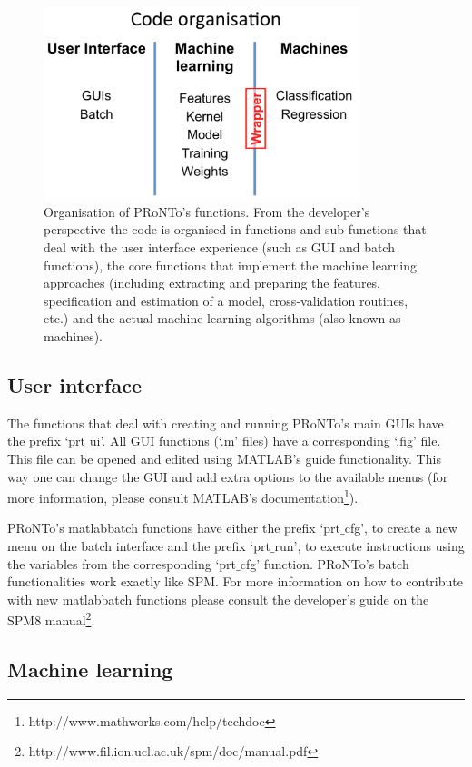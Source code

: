 \begin{figure}[!htbp]
  \begin{center}
      \includegraphics[height=2.2in]{images/code_pronto.png}
   \caption{Organisation of PRoNTo's functions. From the developer's perspective the code is organised in functions and sub functions that deal with the user interface experience (such as GUI and batch functions), the core functions that implement the machine learning approaches (including extracting and preparing the features, specification and estimation of a model, cross-validation routines, etc.) and the actual machine learning algorithms (also known as machines).}
    \label{Fig1.1}
  \end{center}
\end{figure}

\subsection{User interface}

The functions that deal with creating and running PRoNTo's main GUIs have the prefix `prt$\_$ui'. All GUI functions (`.m' files) have a corresponding `.fig' file. This file can be opened and edited using MATLAB's guide functionality. This way one can change the GUI and add extra options to the available menus (for more information, please consult MATLAB's documentation\footnote{http://www.mathworks.com/help/techdoc}).

PRoNTo's matlabbatch functions have either the prefix `prt$\_$cfg', to create a new menu on the batch interface and the prefix `prt$\_$run', to execute instructions using the variables from the corresponding `prt$\_$cfg' function. PRoNTo's batch functionalities work exactly like SPM. For more information on how to contribute with new matlabbatch functions please consult the developer's guide on the SPM8 manual\footnote{http://www.fil.ion.ucl.ac.uk/spm/doc/manual.pdf}.  

\subsection{Machine learning}

